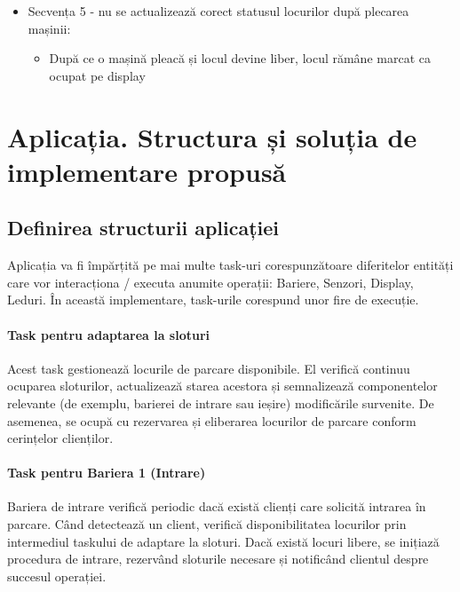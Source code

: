 \documentclass[a4paper,11pt]{report}
\begin{document}
\begin{itemize}
\begin{itemize}
\item Secvența 5 - nu se actualizează corect statusul locurilor după plecarea mașinii: \begin{itemize} \item După ce o mașină pleacă și locul devine liber, locul rămâne marcat ca ocupat pe display \end{itemize} \end{itemize}
\end{itemize}

\chapter{Aplicația. Structura și soluția de implementare propusă}\label{chap:Rezultate} 


\section{Definirea structurii aplicației}\label{sec:Structura}


\color{black} 

Aplicația va fi împărțită pe mai multe task-uri corespunzătoare diferitelor entități care vor interacționa / executa anumite operații: Bariere, Senzori, Display, Leduri. În această implementare, task-urile corespund unor fire de execuție.


\subsubsection{\color{black} Task pentru adaptarea la sloturi}
Acest task gestionează locurile de parcare disponibile. El verifică continuu ocuparea sloturilor, actualizează starea acestora și semnalizează componentelor relevante (de exemplu, barierei de intrare sau ieșire) modificările survenite. De asemenea, se ocupă cu rezervarea și eliberarea locurilor de parcare conform cerințelor clienților. \


\subsubsection{\color{black} Task pentru Bariera 1 (Intrare)}
Bariera de intrare verifică periodic dacă există clienți care solicită intrarea în parcare. Când detectează un client, verifică disponibilitatea locurilor prin intermediul taskului de adaptare la sloturi. Dacă există locuri libere, se inițiază procedura de intrare, rezervând sloturile necesare și notificând clientul despre succesul operației. \
\end{document}
